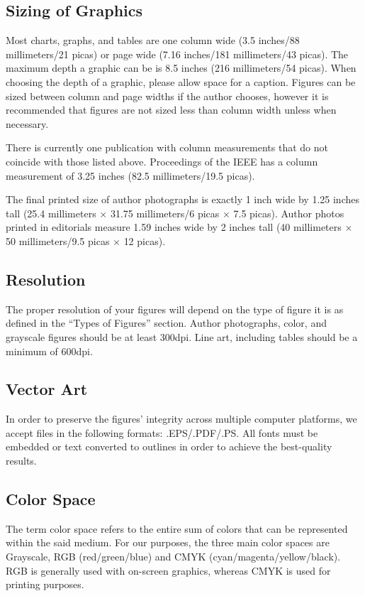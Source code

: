 \documentclass{ieeeaccess}
\begin{document}
\subsection{Sizing of Graphics}
Most charts, graphs, and tables are one column wide (3.5 inches/88
millimeters/21 picas) or page wide (7.16 inches/181 millimeters/43 picas). The
maximum depth a graphic can be is 8.5 inches (216 millimeters/54 picas). When
choosing the depth of a graphic, please allow space for a caption. Figures can
be sized between column and page widths if the author chooses, however it is
recommended that figures are not sized less than column width unless when
necessary.

There is currently one publication with column measurements that do not
coincide with those listed above. Proceedings of the IEEE has a column
measurement of 3.25 inches (82.5 millimeters/19.5 picas).

The final printed size of author photographs is exactly 1 inch wide by 1.25
inches tall (25.4 millimeters$\,\times\,$31.75 millimeters/6
picas$\,\times\,$7.5 picas). Author photos printed in editorials measure 1.59
inches wide by 2 inches tall (40 millimeters$\,\times\,$50 millimeters/9.5
picas$\,\times\,$12 picas).

\subsection{Resolution }
The proper resolution of your figures will depend on the type of figure it is
as defined in the ``Types of Figures'' section. Author photographs, color, and
grayscale figures should be at least 300dpi. Line art, including tables should
be a minimum of 600dpi.

\subsection{Vector Art}
In order to preserve the figures' integrity across multiple computer platforms,
we accept files in the following formats: .EPS/.PDF/.PS. All fonts must be
embedded or text converted to outlines in order to achieve the best-quality
results.

\subsection{Color Space}
The term color space refers to the entire sum of colors that can be represented
within the said medium. For our purposes, the three main color spaces are
Grayscale, RGB (red/green/blue) and CMYK (cyan/magenta/yellow/black). RGB is
generally used with on-screen graphics, whereas CMYK is used for printing
purposes.
\end{document}
